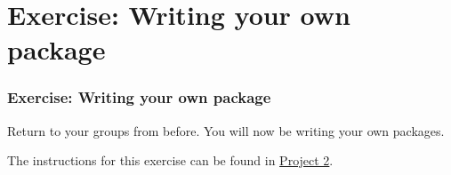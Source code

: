 \documentclass[10pt]{beamer}
\begin{document}
\section{Exercise: Writing your own package}

\begin{frame} \frametitle{Exercise: Writing your own package}

  Return to your groups from before. You will now be writing your own packages.

  \vspace{0.25cm}

  The instructions for this exercise can be found in
  \href{https://github.com/nyupredocs/modularizationandtesting/blob/master/Projects/Project_2_PackageBuilding.md}{Project 2}.

\end{frame}
\end{document}
